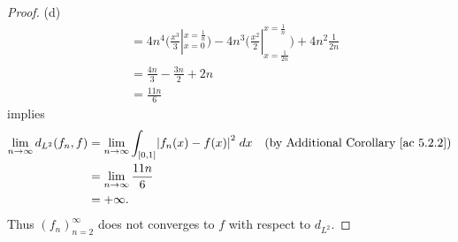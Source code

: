 \begin{proof}{(d)}
\begin{align*}
         & = 4n^4 \bigg(\frac{x^3}{3}|_{x = 0}^{x = \frac{1}{n}}\bigg) - 4n^3 \bigg(\frac{x^2}{2}|_{x = \frac{1}{2n}}^{x = \frac{1}{n}}\bigg) + 4n^2 \frac{1}{2n} \\
         & = \frac{4n}{3} - \frac{3n}{2} + 2n                                                                                                                     \\
         & = \frac{11n}{6}
    \end{align*}
    implies
    \begin{align*}
        \lim_{n \to \infty} d_{L^2}(f_n, f) & = \lim_{n \to \infty} \int_{[0, 1]} \abs{f_n(x) - f(x)}^2 \; dx & \text{(by Additional Corollary \ref{ac 5.2.2})} \\
                                            & = \lim_{n \to \infty} \frac{11n}{6}                                                                               \\
                                            & = +\infty.
    \end{align*}
    Thus \((f_n)_{n = 2}^\infty\) does not converges to \(f\) with respect to \(d_{L^2}\).
\end{proof}